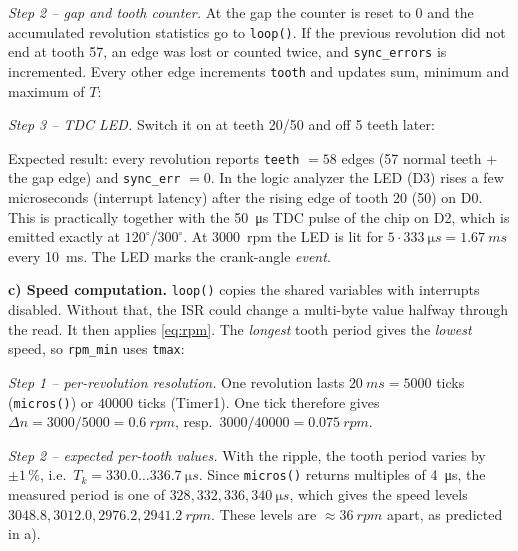 \begin{solution}
\emph{Step 2 -- gap and tooth counter.} At the gap the counter is reset to 0
and the accumulated revolution statistics go to \texttt{loop()}. If the
previous revolution did not end at tooth 57, an edge was lost or counted twice,
and \texttt{sync\_errors} is incremented. Every other edge increments
\texttt{tooth} and updates sum, minimum and maximum of $T$:

\emph{Step 3 -- TDC LED.} Switch it on at teeth 20/50 and off 5 teeth later:

Expected result: every revolution reports \texttt{teeth} $=58$ edges (57
normal teeth + the gap edge) and \texttt{sync\_err} $=0$. In the logic
analyzer the LED (D3) rises a few microseconds (interrupt latency) after the
rising edge of tooth 20 (50) on D0. This is practically together with the
\SI{50}{\micro s} TDC pulse of the chip on D2, which is emitted exactly at
$120^\circ$/$300^\circ$. At \SI{3000}{rpm} the LED is lit for
$5\cdot\SI{333}{\micro s}=\SI{1.67}{ms}$ every \SI{10}{ms}. The LED marks the
crank-angle \emph{event}.

\textbf{c) Speed computation.} \texttt{loop()} copies the shared variables
with interrupts disabled. Without that, the ISR could change a multi-byte
value halfway through the read. It then applies \eqref{eq:rpm}.
The \emph{longest} tooth period gives the \emph{lowest} speed, so
\texttt{rpm\_min} uses \texttt{tmax}:

\emph{Step 1 -- per-revolution resolution.} One revolution lasts
$\SI{20}{ms}=5000$ ticks (\texttt{micros()}) or $40000$ ticks (Timer1). One
tick therefore gives $\Delta n=3000/5000=\SI{0.6}{rpm}$, resp.\
$3000/40000=\SI{0.075}{rpm}$.

\emph{Step 2 -- expected per-tooth values.} With the ripple, the tooth period
varies by $\pm1\,\%$, i.e.\ $T_k=330.0\dots\SI{336.7}{\micro s}$. Since
\texttt{micros()} returns multiples of \SI{4}{\micro s}, the measured period is
one of $328, 332, 336, \SI{340}{\micro s}$, which gives the speed levels
$3048.8, 3012.0, 2976.2, \SI{2941.2}{rpm}$. These levels are
$\approx\SI{36}{rpm}$ apart, as predicted in a).


\end{solution}
